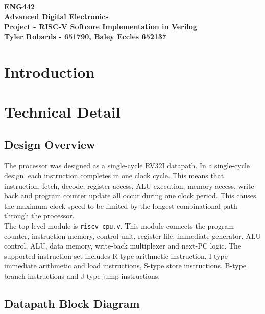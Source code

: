 \documentclass[12pt,a4paper]{article}
\begin{document}
\begin{center}
\textbf{\LARGE ENG442\\[6pt]
Advanced Digital Electronics}\\[10pt]
\textbf{\large Project - RISC-V Softcore Implementation in Verilog\\[4pt]
Tyler Robards - 651790, Baley Eccles 652137}\\
\end{center}

\RaggedRight
\section{Introduction}

\section{Technical Detail}
\subsection{Design Overview}
The processor was designed as a single-cycle RV32I datapath. In a single-cycle design, each instruction completes in one clock cycle. This means that instruction, fetch, decode, register access, ALU execution, memory access, write-back and program counter update all occur during one clock period. This causes the maximum clock speed to be limited by the longest combinational path through the processor.\\
\bigskip
The top-level module is \texttt{riscv\_cpu.v}. This module connects the program counter, instruction memory, control unit, register file, immediate generator, ALU control, ALU, data memory, write-back multiplexer and next-PC logic. The supported instruction set includes R-type arithmetic instruction, I-type immediate arithmetic and load instructions, S-type store instructions, B-type branch instructions and J-type jump instructions.

\subsection{Datapath Block Diagram}
\end{document}
